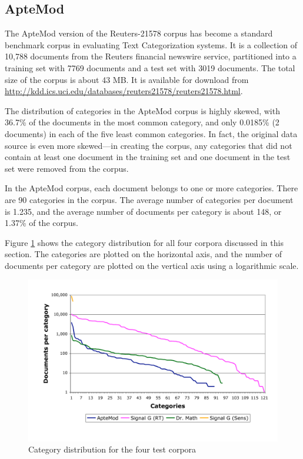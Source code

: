 \subsection{ApteMod}


The ApteMod version of the Reuters-21578 corpus has become a
standard benchmark corpus in evaluating Text Categorization
systems.\cite{yang:99} It is a collection of 10,788 documents from the
Reuters financial newswire service, partitioned into a training set with 7769
documents and a test set with 3019 documents.  The total size of the
corpus is about 43 MB.  It is available for download from
\url{http://kdd.ics.uci.edu/databases/reuters21578/reuters21578.html}.

The distribution of categories in the ApteMod corpus is highly skewed,
with 36.7\% of the documents in the most common category, and only
0.0185\% (2 documents) in each of the five least common categories.
In fact, the original data source is even more skewed---in creating
the corpus, any categories that did not contain at least one document
in the training set and one document in the test set were removed from
the corpus.\cite{yang:99}

In the ApteMod corpus, each document belongs to one or more
categories.  There are 90 categories in the corpus.  The average
number of categories per document is 1.235, and the average number of
documents per category is about 148, or 1.37\% of the corpus.

Figure \ref{Corpora-catdist} shows the category distribution for all
four corpora discussed in this section.  The categories are plotted on
the horizontal axis, and the number of documents per category are
plotted on the vertical axis using a logarithmic scale.

\begin{figure}
\begin{center}
\includegraphics[width=\linewidth]{figures/Corpora-catdist.pdf}
\caption{Category distribution for the four test corpora}
\label{Corpora-catdist}
\end{center}
\end{figure}


